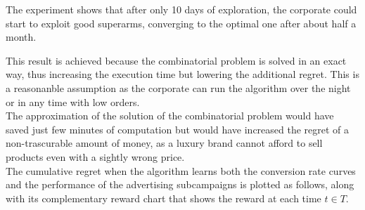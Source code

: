 The experiment shows that after only 10 days of exploration, the corporate could start to exploit good superarms, converging to the optimal one after about half a month.

This result is achieved because the combinatorial problem is solved in an exact way, thus increasing the execution time but lowering the additional regret. This is a reasonanble assumption as the corporate can run the algorithm over the night or in any time with low orders.
\\The approximation of the solution of the combinatorial problem would have saved just few minutes of computation but would have increased the regret of a non-trascurable amount of money, as a luxury brand cannot afford to sell products even with a sightly wrong price.
\\The cumulative regret when the algorithm learns both the conversion rate curves and the performance of the advertising subcampaigns is plotted as follows, along with its complementary reward chart that shows the reward at each time $t \in T$.
\\
